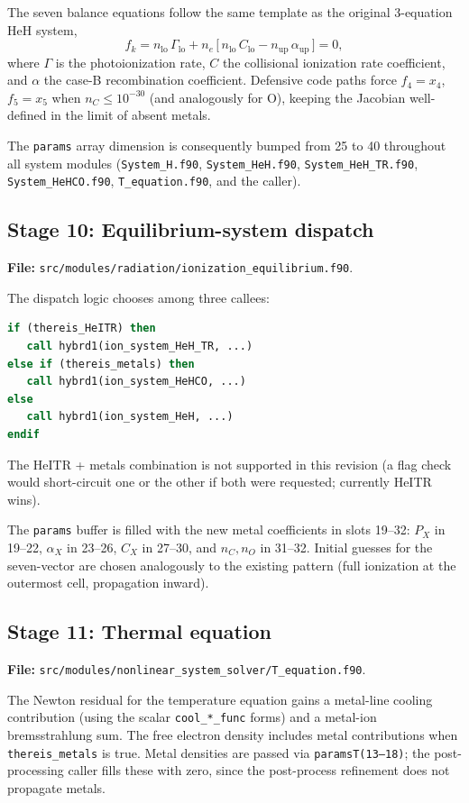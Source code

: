 \documentclass[english,a4paper]{kiseon_memo}
\begin{document}
The seven balance equations follow the same template as the original
3-equation HeH system,
\[
  f_k = n_\mathrm{lo}\,\Gamma_\mathrm{lo}
      + n_e\,\bigl[\,n_\mathrm{lo}\,C_\mathrm{lo}
                  - n_\mathrm{up}\,\alpha_\mathrm{up}\,\bigr] = 0,
\]
where \(\Gamma\) is the photoionization rate, \(C\) the collisional
ionization rate coefficient, and \(\alpha\) the case-B recombination
coefficient.  Defensive code paths force \(f_{4} = x_{4}\),
\(f_{5} = x_{5}\) when \(n_C \le 10^{-30}\) (and analogously for O),
keeping the Jacobian well-defined in the limit of absent metals.

The \texttt{params} array dimension is consequently bumped from 25 to
40 throughout all system modules (\texttt{System\_H.f90},
\texttt{System\_HeH.f90}, \texttt{System\_HeH\_TR.f90},
\texttt{System\_HeHCO.f90}, \texttt{T\_equation.f90}, and the caller).

\subsection{Stage 10: Equilibrium-system dispatch}
\textbf{File:} \texttt{src/modules/radiation/ionization\_equilibrium.f90}.

The dispatch logic chooses among three callees:
\begin{lstlisting}[language=Fortran]
if (thereis_HeITR) then
   call hybrd1(ion_system_HeH_TR, ...)
else if (thereis_metals) then
   call hybrd1(ion_system_HeHCO, ...)
else
   call hybrd1(ion_system_HeH, ...)
endif
\end{lstlisting}
The HeITR + metals combination is not supported in this revision (a
flag check would short-circuit one or the other if both were
requested; currently HeITR wins).

The \texttt{params} buffer is filled with the new metal coefficients
in slots 19--32:
\(P_{X}\) in 19--22, \(\alpha_{X}\) in 23--26, \(C_{X}\) in 27--30,
and \(n_C, n_O\) in 31--32.  Initial guesses for the seven-vector are
chosen analogously to the existing pattern (full ionization at the
outermost cell, propagation inward).

\subsection{Stage 11: Thermal equation}
\textbf{File:} \texttt{src/modules/nonlinear\_system\_solver/T\_equation.f90}.

The Newton residual for the temperature equation gains a metal-line
cooling contribution (using the scalar \texttt{cool\_*\_func} forms)
and a metal-ion bremsstrahlung sum.  The free electron density
includes metal contributions when \texttt{thereis\_metals} is true.
Metal densities are passed via \texttt{paramsT(13--18)}; the
post-processing caller fills these with zero, since the post-process
refinement does not propagate metals.
\end{document}
